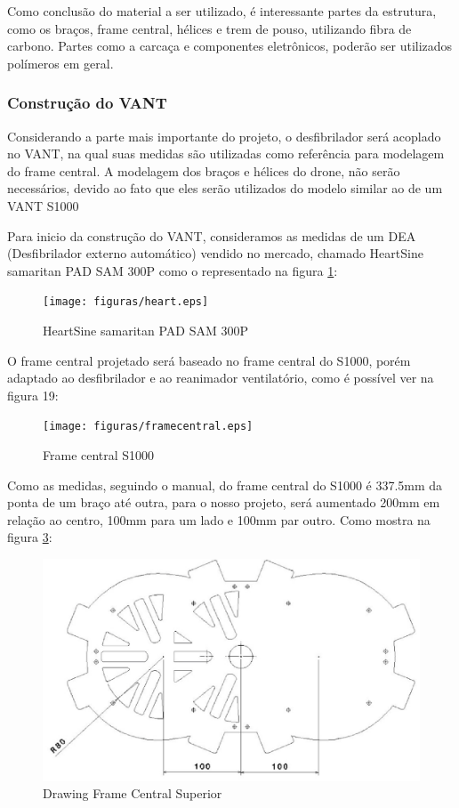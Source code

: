 Como conclusão do material a ser utilizado, é interessante partes da estrutura, como os braços, frame central, hélices e trem de pouso, utilizando fibra de carbono. Partes como a carcaça e componentes eletrônicos, poderão ser utilizados polímeros em geral. 

\subsubsection{Construção do VANT}

Considerando a parte mais importante do projeto, o desfibrilador será acoplado no VANT, na qual suas medidas são utilizadas como referência para modelagem do frame central.  A modelagem dos braços e hélices do drone,  não serão necessários, devido ao fato que eles serão utilizados do modelo similar ao de um VANT S1000

Para inicio da construção do VANT, consideramos as medidas de um DEA (Desfibrilador externo automático) vendido no mercado, chamado HeartSine samaritan PAD SAM 300P  como o representado na figura \ref{fig:heart}:

\begin{figure}[H]
    \centering
      \texttt{[image: figuras/heart.eps]}
    \caption{ HeartSine samaritan PAD SAM 300P}
    \label{fig:heart}
\end{figure}

O frame central projetado será baseado no frame central do S1000, porém adaptado ao desfibrilador e ao reanimador ventilatório, como é possível ver na figura 19: 

\begin{figure}[H]
    \centering
      \texttt{[image: figuras/framecentral.eps]}
    \caption{ Frame central S1000}
    \label{fig:framecentral}
\end{figure}


Como as medidas, seguindo o manual, do frame central do S1000 é 337.5mm da ponta de um braço até outra, para o nosso projeto, será aumentado  200mm em relação ao centro, 100mm para um lado e 100mm par outro. Como mostra na figura \ref{fig:drawing}:

\begin{figure}[H]
    \centering
      \includegraphics[keepaspectratio=true,scale=0.5]{figuras/drawing.eps}
    \caption{ Drawing Frame Central Superior}
    \label{fig:drawing}
\end{figure}

